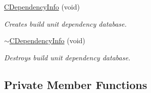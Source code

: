 \begin{DoxyCompactItemize}
\hyperlink{classCDependencyInfo_a4fff8f942c388852af5b1a3ebd235d70}{C\-Dependency\-Info} (void)
\begin{DoxyCompactList}\small\item\em Creates build unit dependency database. \end{DoxyCompactList}\item 
\hyperlink{classCDependencyInfo_a1674b17fa54f4e53571ce9aac6abd88e}{$\sim$\-C\-Dependency\-Info} (void)
\begin{DoxyCompactList}\small\item\em Destroys build unit dependency database. \end{DoxyCompactList}\end{DoxyCompactItemize}
\subsection*{Private Member Functions}
